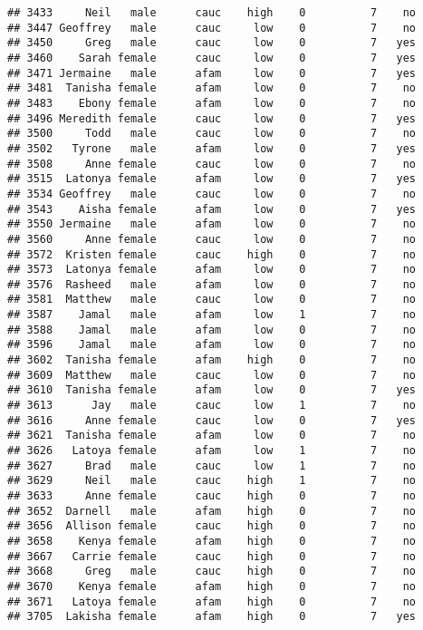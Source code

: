 \documentclass[
]{article}
\begin{document}
\begin{verbatim}
## 3433     Neil   male      cauc    high    0          7    no
## 3447 Geoffrey   male      cauc     low    0          7    no
## 3450     Greg   male      cauc     low    0          7   yes
## 3460    Sarah female      cauc     low    0          7   yes
## 3471 Jermaine   male      afam     low    0          7   yes
## 3481  Tanisha female      afam     low    0          7    no
## 3483    Ebony female      afam     low    0          7    no
## 3496 Meredith female      cauc     low    0          7   yes
## 3500     Todd   male      cauc     low    0          7    no
## 3502   Tyrone   male      afam     low    0          7   yes
## 3508     Anne female      cauc     low    0          7    no
## 3515  Latonya female      afam     low    0          7   yes
## 3534 Geoffrey   male      cauc     low    0          7    no
## 3543    Aisha female      afam     low    0          7   yes
## 3550 Jermaine   male      afam     low    0          7    no
## 3560     Anne female      cauc     low    0          7    no
## 3572  Kristen female      cauc    high    0          7    no
## 3573  Latonya female      afam     low    0          7    no
## 3576  Rasheed   male      afam     low    0          7    no
## 3581  Matthew   male      cauc     low    0          7    no
## 3587    Jamal   male      afam     low    1          7    no
## 3588    Jamal   male      afam     low    0          7    no
## 3596    Jamal   male      afam     low    0          7    no
## 3602  Tanisha female      afam    high    0          7    no
## 3609  Matthew   male      cauc     low    0          7    no
## 3610  Tanisha female      afam     low    0          7   yes
## 3613      Jay   male      cauc     low    1          7    no
## 3616     Anne female      cauc     low    0          7   yes
## 3621  Tanisha female      afam     low    0          7    no
## 3626   Latoya female      afam     low    1          7    no
## 3627     Brad   male      cauc     low    1          7    no
## 3629     Neil   male      cauc    high    1          7    no
## 3633     Anne female      cauc    high    0          7    no
## 3652  Darnell   male      afam    high    0          7    no
## 3656  Allison female      cauc    high    0          7    no
## 3658    Kenya female      afam    high    0          7    no
## 3667   Carrie female      cauc    high    0          7    no
## 3668     Greg   male      cauc    high    0          7    no
## 3670    Kenya female      afam    high    0          7    no
## 3671   Latoya female      afam    high    0          7    no
## 3705  Lakisha female      afam    high    0          7   yes

\end{verbatim}
\end{document}
